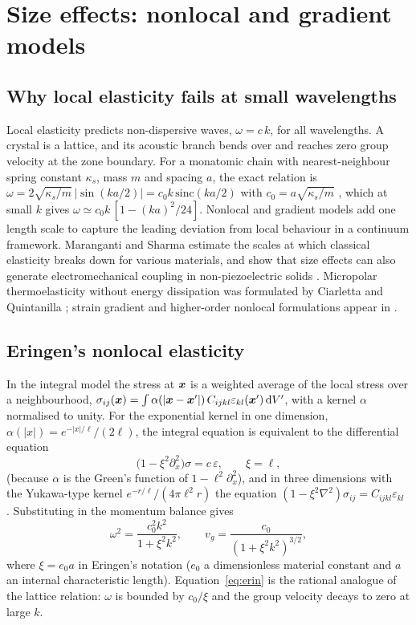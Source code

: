 \section{Size effects: nonlocal and gradient models}\label{sec:size}
\subsection{Why local elasticity fails at small wavelengths}
Local elasticity predicts non-dispersive waves, $\omega=c\,k$, for all wavelengths. A crystal is a lattice, and its acoustic branch bends over and reaches zero group velocity at the zone boundary. For a monatomic chain with nearest-neighbour spring constant $\kappa_s$, mass $m$ and spacing $a$, the exact relation is $\omega=2\sqrt{\kappa_s/m}\,|\sin(ka/2)|=c_0k\,\mathrm{sinc}(ka/2)$ with $c_0=a\sqrt{\kappa_s/m}$ \citep{BornKarman1912}, which at small $k$ gives $\omega\simeq c_0k\,[1-(ka)^2/24]$. Nonlocal and gradient models add one length scale to capture the leading deviation from local behaviour in a continuum framework. Maranganti and Sharma \citep{Maranganti2007} estimate the scales at which classical elasticity breaks down for various materials, and show that size effects can also generate electromechanical coupling in non-piezoelectric solids \citep{Maranganti2006}. Micropolar thermoelasticity without energy dissipation was formulated by Ciarletta \citep{Ciarletta1999} and Quintanilla \citep{Quintanilla2002}; strain gradient and higher-order nonlocal formulations appear in \citep{Gao2007,Lim2015,Ke2014}.

\subsection{Eringen's nonlocal elasticity}
In the integral model the stress at $\bm x$ is a weighted average of the local stress over a neighbourhood,
$\sigma_{ij}(\bm x)=\int\alpha(|\bm x-\bm x'|)\,C_{ijkl}\varepsilon_{kl}(\bm x')\,\mathrm d V'$, with a kernel $\alpha$ normalised to unity. For the exponential kernel in one dimension, $\alpha(|x|)=e^{-|x|/\ell}/(2\ell)$, the integral equation is equivalent to the differential equation
\begin{equation}
\bigl(1-\xi^2\partial_x^2\bigr)\sigma=c\,\varepsilon,\qquad \xi=\ell,\label{eq:eringen}
\end{equation}
(because $\alpha$ is the Green's function of $1-\ell^2\partial_x^2$), and in three dimensions with the Yukawa-type kernel $e^{-r/\ell}/(4\pi\ell^2r)$ the equation $(1-\xi^2\nabla^2)\sigma_{ij}=C_{ijkl}\varepsilon_{kl}$ \citep{Eringen1972,Eringen1983,Eringen2002}. Substituting in the momentum balance gives
\begin{equation}
\omega^2=\frac{c_0^2k^2}{1+\xi^2k^2},\qquad v_g=\frac{c_0}{(1+\xi^2k^2)^{3/2}},\label{eq:erin}
\end{equation}
where $\xi=e_0a$ in Eringen's notation ($e_0$ a dimensionless material constant and $a$ an internal characteristic length). Equation~\eqref{eq:erin} is the rational analogue of the lattice relation: $\omega$ is bounded by $c_0/\xi$ and the group velocity decays to zero at large $k$.

